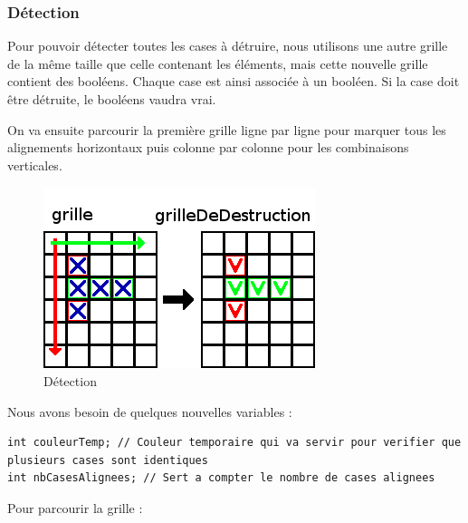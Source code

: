 \subsubsection{Détection}	
	
Pour pouvoir détecter toutes les cases à détruire, nous utilisons une autre grille de la même taille que celle contenant les éléments, mais cette nouvelle grille contient des booléens. Chaque case est ainsi associée à un booléen. Si la case doit être détruite, le booléens vaudra vrai.

On va ensuite parcourir la première grille ligne par ligne pour marquer tous les alignements horizontaux puis colonne par colonne pour les combinaisons verticales.

\begin{figure}[position]
	\center
	\caption{\label{Detection} Détection}
	\includegraphics{imgs/Detection}
\end{figure}

Nous avons besoin de quelques nouvelles variables :

\begin{lstlisting}
int couleurTemp; // Couleur temporaire qui va servir pour verifier que plusieurs cases sont identiques
int nbCasesAlignees; // Sert a compter le nombre de cases alignees
\end{lstlisting}

Pour parcourir la grille :

